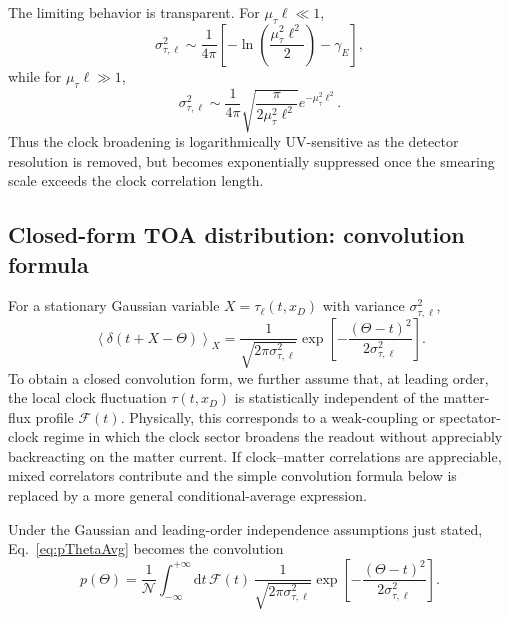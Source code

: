\documentclass[pdflatex,sn-mathphys-num]{sn-jnl}
\theoremstyle{thmstylethree}
\theoremstyle{thmstyleone}
\theoremstyle{thmstyletwo}
\numberwithin{equation}{section}
\newcommand{\dd}{\mathrm{d}}
\newcommand{\F}{\mathcal{F}}
\begin{document}
        The limiting behavior is transparent. For $\mu_\tau\ell\ll1$,
        \begin{equation}
            \sigma_{\tau,\ell}^{2}
            \sim
            \frac{1}{4\pi}
            \left[
            -\ln\left(\frac{\mu_\tau^2\ell^2}{2}\right)-\gamma_E
            \right],
            \label{eq:smallSmearingLimit}
        \end{equation}
        while for $\mu_\tau\ell\gg1$,
        \begin{equation}
            \sigma_{\tau,\ell}^{2}
            \sim
            \frac{1}{4\pi}
            \sqrt{\frac{\pi}{2\mu_\tau^2\ell^2}}
            e^{-\mu_\tau^2\ell^2}.
            \label{eq:largeSmearingLimit}
        \end{equation}
        Thus the clock broadening is logarithmically UV-sensitive as the detector resolution is removed, but becomes exponentially suppressed once the smearing scale exceeds the clock correlation length.
    
    \subsection{Closed-form TOA distribution: convolution formula}
        
        For a stationary Gaussian variable $X=\tau_\ell(t,x_D)$ with variance $\sigma_{\tau,\ell}^2$,
        \begin{equation}
            \left\langle \delta(t+X-\Theta)\right\rangle_X
            =\frac{1}{\sqrt{2\pi\sigma_{\tau,\ell}^2}}
            \exp\!\left[-\frac{(\Theta-t)^2}{2\sigma_{\tau,\ell}^2}\right].
        \end{equation}
        To obtain a closed convolution form, we further assume that, at leading order, the local clock fluctuation $\tau(t,x_D)$ is statistically independent of the matter-flux profile $\mathcal{F}(t)$. Physically, this corresponds to a weak-coupling or spectator-clock regime in which the clock sector broadens the readout without appreciably backreacting on the matter current. If clock--matter correlations are appreciable, mixed correlators contribute and the simple convolution formula below is replaced by a more general conditional-average expression.
        
        Under the Gaussian and leading-order independence assumptions just stated, Eq.~\eqref{eq:pThetaAvg} becomes the convolution
        \begin{equation}
            p(\Theta)=\frac{1}{\mathcal{N}}
            \int_{-\infty}^{+\infty}\dd t\,
            \F(t)\,
            \frac{1}{\sqrt{2\pi\sigma_{\tau,\ell}^2}}
            \exp\!\left[-\frac{(\Theta-t)^2}{2\sigma_{\tau,\ell}^2}\right].
            \label{eq:convolution}
        \end{equation}
        
\end{document}
